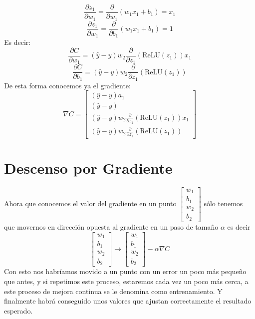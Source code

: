 \documentclass{article}
\begin{document}
	\[
	\frac{\partial z_1}{\partial w_1} = \frac{\partial}{\partial w_1} (w_1x_1 + b_1) = x_1
	\]
	\[
	\frac{\partial z_1}{\partial w_1} = \frac{\partial}{\partial b_1} (w_1x_1 + b_1) = 1
	\]
	Es decir:
	\[
	\frac{\partial C}{\partial w_1} = (\hat{y} - y)w_2\frac{\partial}{\partial z_1}(\text{ReLU}(z_1))x_1
	\]
	\[
	\frac{\partial C}{\partial b_1} = (\hat{y} - y)w_2\frac{\partial}{\partial z_1}(\text{ReLU}(z_1))
	\]
	De esta forma conocemos ya el gradiente:
	\[
	\nabla C = 
	\begin{bmatrix}
		(\hat{y} - y)a_1 \\
		(\hat{y} - y) \\
		(\hat{y} - y)w_2\frac{\partial}{\partial z_1}(\text{ReLU}(z_1))x_1 \\
		(\hat{y} - y)w_2\frac{\partial}{\partial z_1}(\text{ReLU}(z_1))
	\end{bmatrix}
	\]
	
	\section{Descenso por Gradiente}
	Ahora que conocemos el valor del gradiente en un punto \( \begin{bmatrix}
		w_1\\ 
		b_1\\
		w_2\\
		b_2
	\end{bmatrix}\) sólo tenemos que movernos en dirección opuesta al gradiente en un paso de tamaño \(\alpha\) 
	es decir 
	\[ \begin{bmatrix}
		w_1\\ 
		b_1\\
		w_2\\
		b_2
	\end{bmatrix} 
	\rightarrow
	\begin{bmatrix}
		w_1\\ 
		b_1\\
		w_2\\
		b_2
	\end{bmatrix} - \alpha \nabla C
	\]
	Con esto nos habríamos movido a un punto con un error un poco más pequeño que antes, y si repetimos este proceso, estaremos cada vez un poco más cerca, a este proceso de mejora continua se le denomina como entrenamiento. Y finalmente habrá conseguido unos valores que ajustan correctamente el resultado esperado.
	\newpage
\end{document}
